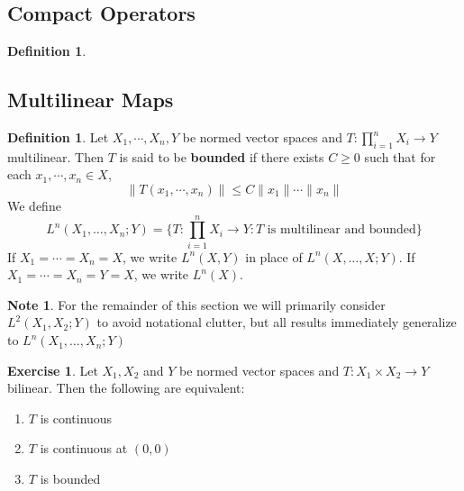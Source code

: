 \documentclass[12pt]{amsart}
\theoremstyle{definition}
\newtheorem{defn}[definition]{Definition}
\newtheorem{note}[definition]{Note}
\newtheorem{ex}[definition]{Exercise}
\newcommand{\tbf}[1]{\textbf{#1}}
\DeclareMathOperator*{\0}{\mbf{0}}
\DeclareMathOperator*{\1}{\mbf{1}}
\newcommand{\lex}[1]{\label{ex:#1}}
\newcommand{\ld}[1]{\label{defn:#1}}
\begin{document}
	
	
	







	
	
	
	






\newpage
\subsection{Compact Operators}


\begin{defn}

\end{defn}























	\newpage
	\subsection{Multilinear Maps}	
	\begin{defn} \ld{43001}
	Let $X_1, \cdots, X_n, Y$ be normed vector spaces and $T: \prod\limits_{i=1}^n X_i \rightarrow Y$ multilinear. Then $T$ is said to be \tbf{bounded} if there exists $C \geq 0$ such that for each $x_1, \cdots, x_n \in X$, $$\|T(x_1, \cdots, x_n)\| \leq C \|x_1\| \cdots \|x_n\|$$
	We define $$L^n (X_1, \dots, X_n; Y) = \bigg\{T: \prod\limits_{i=1}^n X_i \rightarrow Y: T \text{ is multilinear and bounded}\bigg \}$$ 
	If $X_1 = \cdots = X_n = X$, we write $L^n(X,Y)$ in place of $L^n (X, \dots, X; Y) $. If $X_1 = \cdots = X_n = Y =  X$, we write $L^n(X)$. 
	\end{defn}
	
	\begin{note}
	For the remainder of this section we will primarily consider $L^2(X_1, X_2; Y)$ to avoid notational clutter, but all results immediately generalize to $L^n(X_1, \ldots, X_n;Y)$
	\end{note}
	
	\begin{ex} \lex{43002}
	Let $X_1, X_2$ and $Y$ be normed vector spaces and $T: X_1 \times X_2 \rightarrow Y$ bilinear. Then the following are equivalent:
	\begin{enumerate}
			\item $T$ is continuous
			\item $T$ is continuous at $(0,0)$
			\item $T$ is bounded
		\end{enumerate}
	\end{ex}
	
\end{document}
